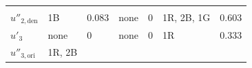\begin{longtable}[]{@{}lllllll@{}}
\begin{minipage}[t]{0.08\columnwidth}
\end{minipage}\tabularnewline
\begin{minipage}[t]{0.12\columnwidth}\raggedright
\(u''_{2,\text{den}}\)\strut
\end{minipage} & \begin{minipage}[t]{0.14\columnwidth}\raggedright
1B\strut
\end{minipage} & \begin{minipage}[t]{0.08\columnwidth}\raggedright
0.083\strut
\end{minipage} & \begin{minipage}[t]{0.14\columnwidth}\raggedright
none\strut
\end{minipage} & \begin{minipage}[t]{0.08\columnwidth}\raggedright
0\strut
\end{minipage} & \begin{minipage}[t]{0.14\columnwidth}\raggedright
1R, 2B, 1G\strut
\end{minipage} & \begin{minipage}[t]{0.08\columnwidth}\raggedright
0.603\strut
\end{minipage}\tabularnewline
\begin{minipage}[t]{0.12\columnwidth}\raggedright
\(u'_3\)\strut
\end{minipage} & \begin{minipage}[t]{0.14\columnwidth}\raggedright
none\strut
\end{minipage} & \begin{minipage}[t]{0.08\columnwidth}\raggedright
0\strut
\end{minipage} & \begin{minipage}[t]{0.14\columnwidth}\raggedright
none\strut
\end{minipage} & \begin{minipage}[t]{0.08\columnwidth}\raggedright
0\strut
\end{minipage} & \begin{minipage}[t]{0.14\columnwidth}\raggedright
1R\strut
\end{minipage} & \begin{minipage}[t]{0.08\columnwidth}\raggedright
0.333\strut
\end{minipage}\tabularnewline
\begin{minipage}[t]{0.12\columnwidth}\raggedright
\(u''_{3,\text{ori}}\)\strut
\end{minipage} & \begin{minipage}[t]{0.14\columnwidth}\raggedright
1R, 2B\strut

\end{minipage}
\end{longtable}
